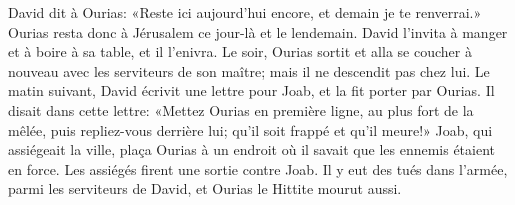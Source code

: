 David dit à Ourias:
	«Reste ici aujourd’hui encore, et demain je te renverrai.»
Ourias resta donc à Jérusalem ce jour-là et le lendemain.
David l’invita à manger et à boire à sa table, et il l’enivra.
Le soir, Ourias sortit et alla se coucher à nouveau avec les serviteurs de son maître;
	mais il ne descendit pas chez lui.
Le matin suivant, David écrivit une lettre pour Joab, et la fit porter par Ourias.
Il disait dans cette lettre:
	«Mettez Ourias en première ligne, au plus fort de la mêlée,
	puis repliez-vous derrière lui; qu’il soit frappé et qu’il meure!»
Joab, qui assiégeait la ville,
	plaça Ourias à un endroit où il savait que les ennemis étaient en force.
Les assiégés firent une sortie contre Joab.
Il y eut des tués dans l’armée, parmi les serviteurs de David,
	et Ourias le Hittite mourut aussi.
